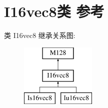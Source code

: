 \hypertarget{class_i16vec8}{}\section{I16vec8类 参考}
\label{class_i16vec8}
类 I16vec8 继承关系图\+:\begin{figure}[H]
\begin{center}
\leavevmode
\includegraphics[height=3.000000cm]{class_i16vec8}
\end{center}
\end{figure}
